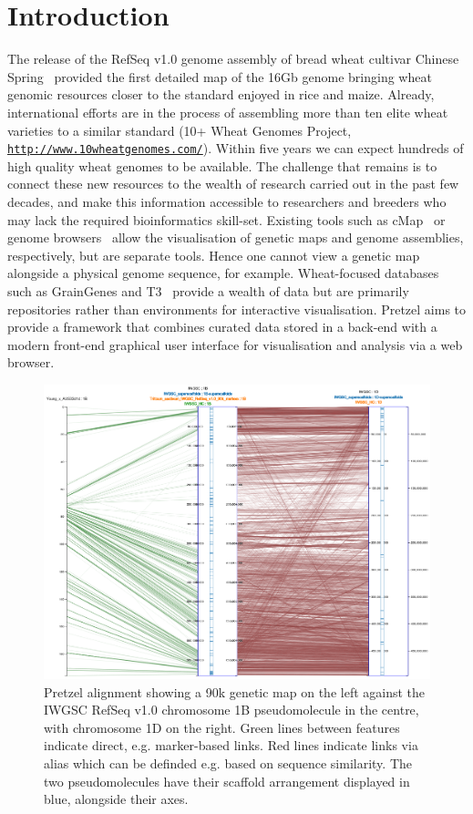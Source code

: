 
\section{Introduction}

The release of the RefSeq v1.0 genome assembly of bread wheat cultivar Chinese
Spring~\citep{IWGSC2018} provided the first detailed map of the 16Gb genome bringing wheat genomic
resources closer to the standard enjoyed in rice and maize. 
%
Already, international efforts are in the process of assembling more than ten elite wheat varieties
to a similar standard (10+ Wheat Genomes Project,
\href{http://www.10wheatgenomes.com/}{\nolinkurl{http://www.10wheatgenomes.com/}}).
%
Within five years we can expect hundreds of high quality wheat genomes to be available. 
%
The challenge that remains is to connect these new resources to the wealth of research carried out
in the past few decades, and make this information accessible to researchers and breeders who may
lack the required bioinformatics skill-set.
%
Existing tools such as cMap~\citep{fang2003cmap} or genome
browsers~\citep{Stein2013GBrowse,Buels2016JBrowse} allow the visualisation of genetic maps and genome
assemblies, respectively, but are separate tools. Hence one cannot view a genetic map alongside a
physical genome sequence, for example. 
%
Wheat-focused databases such as GrainGenes and T3~\citep{Blake2016T3} provide a wealth of data but
are primarily repositories rather than environments for interactive visualisation.
%
Pretzel aims to provide a framework that combines curated data stored in a back-end with a
modern front-end graphical user interface for visualisation and analysis via a web browser. 
%
\begin{figure}
\centering
  \includegraphics[width=\textwidth]{pretzel.png}
\caption{
  Pretzel alignment showing a 90k genetic map on the left against the IWGSC RefSeq v1.0 chromosome 1B pseudomolecule in the centre, 
  with chromosome 1D on the right. 
  Green lines between features indicate direct, e.g. marker-based links. 
  Red lines indicate links via alias which can be definded e.g. based on sequence similarity. 
  The two pseudomolecules have their scaffold arrangement displayed in blue, alongside their axes.
}
\label{fig:01}
\end{figure}
%
